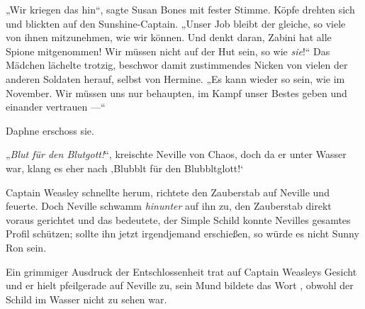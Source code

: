 „Wir kriegen das hin“, sagte Susan Bones mit fester Stimme. Köpfe drehten sich und blickten auf den Sunshine-Captain.
„Unser Job bleibt der gleiche, so viele von ihnen mitzunehmen, wie wir können. Und denkt daran, Zabini hat alle Spione mitgenommen! Wir müssen nicht auf der Hut sein, so wie \emph{sie}!“ Das Mädchen lächelte trotzig, beschwor damit zustimmendes Nicken von vielen der anderen Soldaten herauf, selbst von Hermine.
„Es kann wieder so sein, wie im November. Wir müssen uns nur behaupten, im Kampf unser Bestes geben und einander vertrauen —“

Daphne erschoss sie.

\later

„\emph{Blut für den Blutgott!}“, kreischte Neville von Chaos, doch da er unter Wasser war, klang es eher nach ‚Blubblt für den Blubbltglott!‘

Captain Weasley schnellte herum, richtete den Zauberstab auf Neville und feuerte. Doch Neville schwamm \emph{hinunter} auf ihn zu, den Zauberstab direkt voraus gerichtet und das bedeutete, der Simple Schild konnte Nevilles gesamtes Profil schützen; sollte ihn jetzt irgendjemand erschießen, so würde es nicht Sunny Ron sein.

Ein grimmiger Ausdruck der Entschlossenheit trat auf Captain Weasleys Gesicht und er hielt pfeilgerade auf Neville zu, sein Mund bildete das Wort , obwohl der Schild im Wasser nicht zu sehen war.

